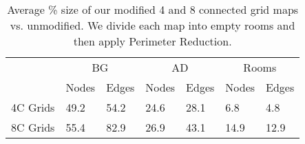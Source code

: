 \begin{table}[tb]
\caption{Average \% size of our modified 4 and 8 connected grid maps vs. unmodified.
We divide each map into empty rooms and then apply Perimeter Reduction.}
\label{table-graphsize}
\begin{center}
\begin{tabular*}{\columnwidth}{p{1.8cm}m{0.62cm}m{0.62cm}m{0.62cm}m{0.62cm}m{0.62cm}m{0.62cm}}
  \hline
   & \multicolumn{2}{c}{BG} & \multicolumn{2}{c}{AD} & \multicolumn{2}{c}{Rooms}\\
	& Nodes & Edges & Nodes & Edges & Nodes & Edges \\
  \hline
%
4C Grids & 49.2 & 54.2 & 24.6 & 28.1 & 6.8 & 4.8 \\  
8C Grids & 55.4 & 82.9 & 26.9 & 43.1 & 14.9 & 12.9 \\ 

   \hline
\end{tabular*}
\end{center}
\end{table}

